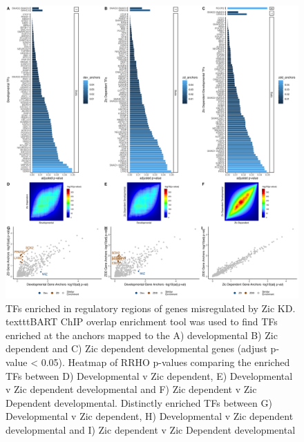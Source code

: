 \documentclass[fleqn,10pt]{wlscirep}
\begin{document}
\begin{figure}[!ht]
\centering
\includegraphics[width=.95\textwidth]{../figures/supp_figure_distinct.png}
\caption{TFs enriched in regulatory regions of genes misregulated by Zic KD. texttt{BART} ChIP overlap enrichment tool was used to find TFs enriched at the anchors mapped to the A) developmental B) Zic dependent and C) Zic dependent developmental genes (adjust p-value < 0.05). Heatmap of RRHO p-values comparing the enriched TFs between D) Developmental v Zic dependent, E) Developmental v Zic dependent developmental and F) Zic dependent v Zic Dependent developmental. Distinctly enriched TFs between G) Developmental v Zic dependent, H) Developmental v Zic dependent developmental and I) Zic dependent v Zic Dependent developmental  }
\label{fig:zic_target_tfs}
\end{figure}
\end{document}
